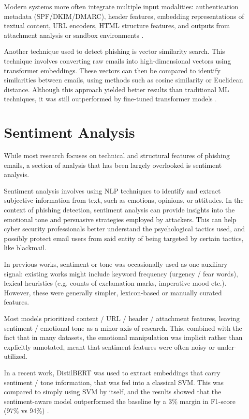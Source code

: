 Modern systems more often integrate multiple input modalities: authentication metadata (\ac{SPF}/\ac{DKIM}/\ac{DMARC}), header features, embedding representations of textual content, URL encoders, HTML structure features, and outputs from attachment analysis or sandbox environments \cite{PATRA2025110403, electronics12204261}.

Another technique used to detect phishing is vector similarity search. This technique involves converting raw emails into high-dimensional vectors using transformer embeddings. These vectors can then be compared to identify similarities between emails, using methods such as cosine similarity or Euclidean distance. Although this approach yielded better results than traditional \ac{ML} techniques, it was still outperformed by fine-tuned transformer models \cite{PATRA2025110403}.

\section{Sentiment Analysis}

While most research focuses on technical and structural features of phishing emails, a section of analysis that has been largely overlooked is sentiment analysis.

Sentiment analysis involves using \ac{NLP} techniques to identify and extract subjective information from text, such as emotions, opinions, or attitudes. In the context of phishing detection, sentiment analysis can provide insights into the emotional tone and persuasive strategies employed by attackers. This can help cyber security professionals better understand the psychological tactics used, and possibly protect email users from said entity of being targeted by certain tactics, like blackmail.

In previous works, sentiment or tone was occasionally used as one auxiliary signal: existing works might include keyword frequency (urgency / fear words), lexical heuristics (e.g. counts of exclamation marks, imperative mood etc.). However, these were generally simpler, lexicon-based or manually curated features.

Most models prioritized content / URL / header / attachment features, leaving sentiment / emotional tone as a minor axis of research. This, combined with the fact that in many datasets, the emotional manipulation was implicit rather than explicitly annotated, meant that sentiment features were often noisy or under-utilized.

In a recent work, \ac{DistilBERT} was used to extract embeddings that carry sentiment / tone information, that was fed into a classical \ac{SVM}. This was compared to simply using \ac{SVM} by itself, and the results showed that the sentiment-aware model outperformed the baseline by a 3\% margin in F1-score (97\% vs 94\%) \cite{salian2024enhancing}.

